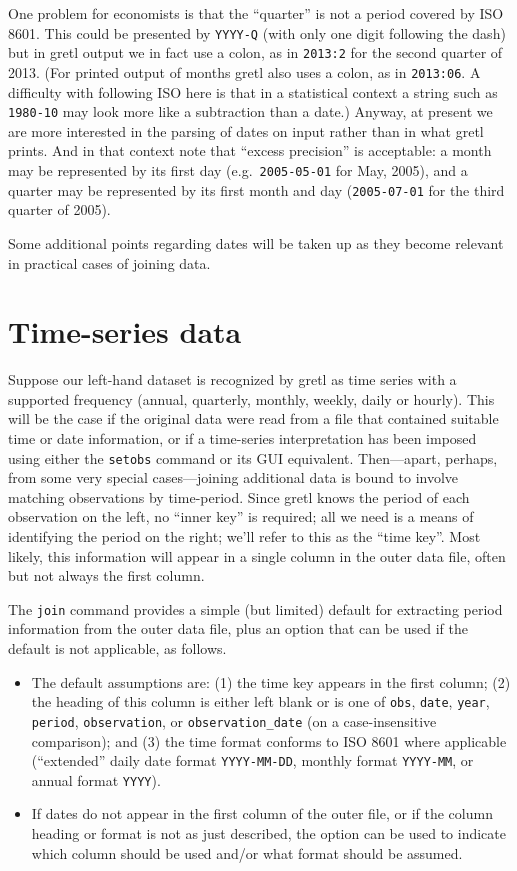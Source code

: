 One problem for economists is that the ``quarter'' is not a period
covered by ISO 8601. This could be presented by \texttt{YYYY-Q} (with
only one digit following the dash) but in gretl output we in fact use
a colon, as in \texttt{2013:2} for the second quarter of 2013. (For
printed output of months gretl also uses a colon, as in
\texttt{2013:06}. A difficulty with following ISO here is that in a
statistical context a string such as \texttt{1980-10} may look more
like a subtraction than a date.)  Anyway, at present we are more
interested in the parsing of dates on input rather than in what gretl
prints. And in that context note that ``excess precision'' is
acceptable: a month may be represented by its first day (e.g.\
\texttt{2005-05-01} for May, 2005), and a quarter may be represented
by its first month and day (\texttt{2005-07-01} for the third quarter
of 2005).

Some additional points regarding dates will be taken up as they become
relevant in practical cases of joining data.

\section{Time-series data}
\label{sec:join-timeser}

Suppose our left-hand dataset is recognized by gretl as time series
with a supported frequency (annual, quarterly, monthly, weekly, daily
or hourly). This will be the case if the original data were read from
a file that contained suitable time or date information, or if a
time-series interpretation has been imposed using either the
\texttt{setobs} command or its GUI equivalent.  Then---apart, perhaps,
from some very special cases---joining additional data is bound to
involve matching observations by time-period. Since gretl knows the
period of each observation on the left, no ``inner key'' is required;
all we need is a means of identifying the period on the right; we'll
refer to this as the ``time key''. Most likely, this information will
appear in a single column in the outer data file, often but not always
the first column.

The \texttt{join} command provides a simple (but limited) default for
extracting period information from the outer data file, plus an
option that can be used if the default is not applicable, as follows.
\begin{itemize}
\item The default assumptions are: (1) the time key appears in the
  first column; (2) the heading of this column is either left blank or
  is one of \texttt{obs}, \texttt{date}, \texttt{year},
  \texttt{period}, \texttt{observation}, or \verb|observation_date|
  (on a case-insensitive comparison); and (3) the time format conforms
  to ISO 8601 where applicable (``extended'' daily date format
  \texttt{YYYY-MM-DD}, monthly format \texttt{YYYY-MM}, or annual
  format \texttt{YYYY}).
\item If dates do not appear in the first column of the outer file, or
  if the column heading or format is not as just described, the
   option can be used to indicate which column should be
  used and/or what format should be assumed.
\end{itemize}

